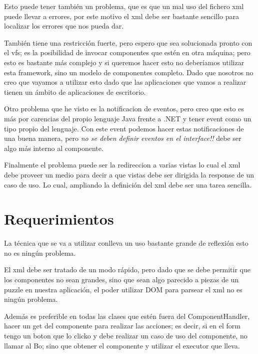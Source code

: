 \documentclass[a4paper]{article}
\begin{document}
Esto puede tener también un problema, que es que un mal uso del fichero xml
puede llevar a errores, por este motivo el xml debe ser bastante sencillo para
localizar los errores que nos pueda dar.

También tiene una restricción fuerte, pero espero que sea solucionada pronto con
el vfs; es la posibilidad de invocar componentes que estén en otra máquina; pero
esto es bastante más complejo y si queremos hacer esto no deberíamos utilizar
esta framework, sino un modelo de componentes completo.  Dado que nosotros no
creo que vayamos a utilizar esto dado que las aplicaciones que vamos a realizar
tienen un ámbito de aplicaciones de escritorio.

Otro problema que he visto es la notificacion de eventos, pero creo que esto es
más por carencias del propio lenguaje Java frente a .NET y tener event como un
tipo propio del lenguaje.  Con este event podemos hacer estas notificaciones de
una buena manera, pero \emph{no se deben definir eventos en el interface!!} debe
ser algo más interno al componente.

Finalmente el problema puede ser la redireccion a varias vistas lo cual el xml
debe proveer un medio para decir a que vistas debe ser dirigida la response de
un caso de uso.  Lo cual, ampliando la definición del xml debe ser una tarea
sencilla.

\section{Requerimientos}
La técnica que se va a utilizar conlleva un uso bastante grande de reflexión
esto no es ningún problema.

El xml debe ser tratado de un modo rápido, pero dado que se debe permitir que
los componentes no sean grandes, sino que sean algo parecido a piezas de un
puzzle en nuestra aplicación, el poder utilizar DOM para parsear el xml no es
ningún problema.

Además es preferible en todas las clases que estén fuera del ComponentHandler,
hacer un get del componente para realizar las acciones; es decir, si en el form
tengo un boton que lo clicko y debe realizar un caso de uso del componente, no
llamar al Bo; sino que obtener el componente y utilizar el executor que lleva.
\end{document}
